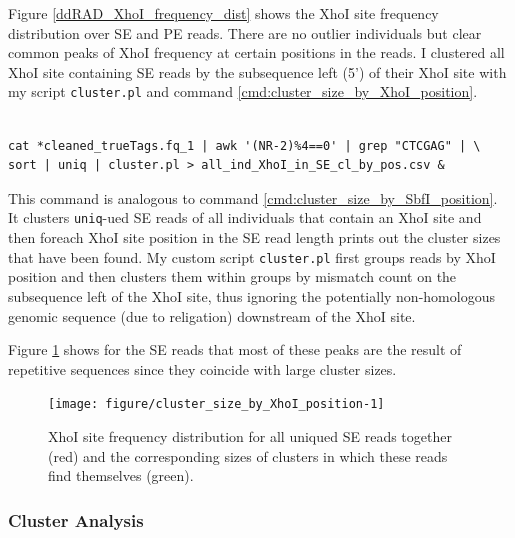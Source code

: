 \documentclass[a4paper,12pt,times,print,index,custombib,custommargin]{PhDThesisPSnPDF}\usepackage[]{graphicx}\usepackage[]{color}
\newenvironment{knitrout}{}{} %
\begin{document}
Figure \ref{ddRAD_XhoI_frequency_dist} shows the XhoI site frequency distribution over SE and PE reads. There are no outlier individuals but clear common peaks of XhoI frequency at certain positions in the reads. I clustered all XhoI site containing SE reads by the subsequence left (5') of their XhoI site with my script \texttt{cluster.pl} and command \ref{cmd:cluster_size_by_XhoI_position}. 
%
\begin{cmd}
\captionsetup{type=cmd}
\begin{Verbatim}[fontsize=\scriptsize, formatcom=\color{darkgray}]

cat *cleaned_trueTags.fq_1 | awk '(NR-2)%4==0' | grep "CTCGAG" | \
sort | uniq | cluster.pl > all_ind_XhoI_in_SE_cl_by_pos.csv & 
\end{Verbatim}
\caption{\small This command is analogous to command \ref{cmd:cluster_size_by_SbfI_position}. It clusters \texttt{uniq}-ued SE reads of all individuals that contain an XhoI site and then foreach XhoI site position in the SE read length prints out the cluster sizes that have been found. My custom script \texttt{cluster.pl} first groups reads by XhoI position and then clusters them within groups by mismatch count on the subsequence left of the XhoI site, thus ignoring the potentially non-homologous genomic sequence (due to religation) downstream of the XhoI site.}
\label{cmd:cluster_size_by_XhoI_position}
\end{cmd}
%
Figure \ref{cluster_size_by_XhoI_position} shows for the SE reads that most of these peaks are the result of repetitive sequences since they coincide with large cluster sizes. 
%
\begin{figure}
\begin{knitrout}
\color{fgcolor}

{\centering \texttt{[image: figure/cluster\_size\_by\_XhoI\_position-1]} 

}



\end{knitrout}
\caption{XhoI site frequency distribution for all uniqued SE reads together (red) and the corresponding sizes of clusters in which these reads find themselves (green).}
\label{cluster_size_by_XhoI_position}
\end{figure}
%



\subsubsection{Cluster Analysis}\label{cluster_analysis}
\end{document}
